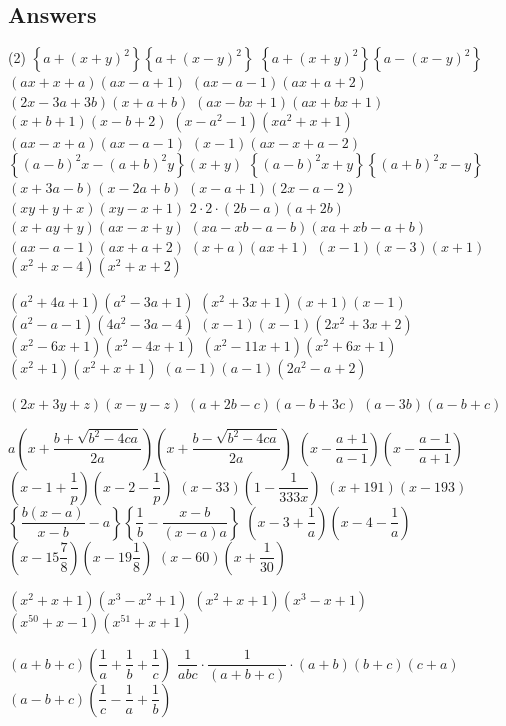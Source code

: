	\subsection*{Answers}
		\begin{tasks}[label = \arabic*.,label-width = 1.5em](2) %
			\task $\left\{a+(x+y)^2\right\}\left\{a+(x-y)^2\right\}$
			\task $\left\{a+(x+y)^2\right\}\left\{a-(x-y)^2\right\}$
			\task $(ax+x+a)(ax-a+1)$
			\task $(ax-a-1)(ax+a+2)$
			\task $(2x-3a+3b)(x+a+b)$
			\task $(ax-bx+1)(ax+bx+1)$
			\task $(x+b+1)(x-b+2)$
			\task $(x-a^2-1)(xa^2+x+1)$
			\task $(ax-x+a)(ax-a-1)$
			\task $(x-1)(ax-x+a-2)$
			\task $\left\{(a-b)^2x-(a+b)^2y\right\}(x+y)$
			\task $\left\{(a-b)^2x+y\right\}\left\{(a+b)^2x-y\right\}$
			\task $(x+3a-b)(x-2a+b)$
			\task $(x-a+1)(2x-a-2)$
			\task $(xy+y+x)(xy-x+1)$
			\task $2\cdot2\cdot(2b-a)(a+2b)$
			\task $(x+ay+y)(ax-x+y)$
			\task $(xa-xb-a-b)(xa+xb-a+b)$
			\task $(ax-a-1)(ax+a+2)$
			\task $(x+a)(ax+1)$
			\task $(x-1)(x-3)(x+1)$
			\task $(x^2+x-4)(x^2+x+2)$

			\task $(a^2+4a+1)(a^2-3a+1)$
			\task $(x^2+3x+1)(x+1)(x-1)$
			\task $(a^2-a-1)(4a^2-3a-4)$
			\task $(x-1)(x-1)(2x^2+3x+2)$
			\task $(x^2-6x+1)(x^2-4x+1)$
			\task $(x^2-11x+1)(x^2+6x+1)$
			\task $(x^2+1)(x^2+x+1)$
			\task $(a-1)(a-1)(2a^2-a+2)$


			\task $(2x+3y+z)(x-y-z)$
			\task $(a+2b-c)(a-b+3c)$
			\task $(a-3b)(a-b+c)$


			\task $a\left(x+\dfrac{b+\sqrt{b^2-4ca}}{2a}\right)\left(x+\dfrac{b-\sqrt{b^2-4ca}}{2a}\right)$
			\task $\left(x-\dfrac{a+1}{a-1}\right)\left(x-\dfrac{a-1}{a+1}\right)$
			\task $\left(x-1+\dfrac{1}{p}\right)\left(x-2-\dfrac{1}{p}\right)$
			\task $(x-33)\left(1-\dfrac{1}{333x}\right)$
			\task $(x+191)(x-193)$
			\task $\left\{\dfrac{b(x-a)}{x-b}-a\right\}\left\{\dfrac{1}{b}-\dfrac{x-b}{(x-a)a}\right\}$
			\task $\left(x-3+\dfrac{1}{a}\right)\left(x-4-\dfrac{1}{a}\right)$
			\task $\left(x-15\dfrac{7}{8}\right)\left(x-19\dfrac{1}{8}\right)$
			\task $\left(x-60\right)\left(x+\dfrac{1}{30}\right)$
			


			\task $(x^2+x+1)(x^3-x^2+1)$
			\task $(x^2+x+1)(x^3-x+1)$
			\task $(x^{50}+x-1)(x^{51}+x+1)$





			\task $(a+b+c)\left(\dfrac{1}{a}+\dfrac{1}{b}+\dfrac{1}{c}\right)$
			\task $\dfrac{1}{abc}\cdot\dfrac{1}{(a+b+c)}\cdot(a+b)(b+c)(c+a)$
			\task $(a-b+c)\left(\dfrac{1}{c}-\dfrac{1}{a}+\dfrac{1}{b}\right)$


\end{tasks}
